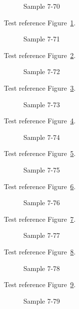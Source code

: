 \begin{figure}[tbhp]
\caption{Sample 7-70}
\label{fig:sample-7-70}
\end{figure}

Test reference Figure~\ref{fig:sample-7-70}.

\begin{figure}[tbhp]
\caption{Sample 7-71}
\label{fig:sample-7-71}
\end{figure}

Test reference Figure~\ref{fig:sample-7-71}.

\begin{figure}[tbhp]
\caption{Sample 7-72}
\label{fig:sample-7-72}
\end{figure}

Test reference Figure~\ref{fig:sample-7-72}.

\begin{figure}[tbhp]
\caption{Sample 7-73}
\label{fig:sample-7-73}
\end{figure}

Test reference Figure~\ref{fig:sample-7-73}.

\begin{figure}[tbhp]
\caption{Sample 7-74}
\label{fig:sample-7-74}
\end{figure}

Test reference Figure~\ref{fig:sample-7-74}.

\begin{figure}[tbhp]
\caption{Sample 7-75}
\label{fig:sample-7-75}
\end{figure}

Test reference Figure~\ref{fig:sample-7-75}.

\begin{figure}[tbhp]
\caption{Sample 7-76}
\label{fig:sample-7-76}
\end{figure}

Test reference Figure~\ref{fig:sample-7-76}.

\begin{figure}[tbhp]
\caption{Sample 7-77}
\label{fig:sample-7-77}
\end{figure}

Test reference Figure~\ref{fig:sample-7-77}.

\begin{figure}[tbhp]
\caption{Sample 7-78}
\label{fig:sample-7-78}
\end{figure}

Test reference Figure~\ref{fig:sample-7-78}.

\begin{figure}[tbhp]
\caption{Sample 7-79}
\label{fig:sample-7-79}
\end{figure}

